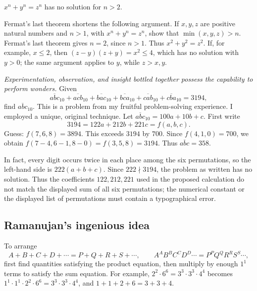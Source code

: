 \documentclass[11pt,a4paper]{article}
\begin{document}
\setcounter{theorem}{50}\begin{lemma}
$x^n+y^n=z^n$ has no solution for $n>2$.
\end{lemma}
Fermat's last theorem shortens the following argument.
If $x,y,z$ are positive natural numbers and $n>1$, with $x^n+y^n=z^n$, show that $\min(x,y,z)>n$.
Fermat's last theorem gives $n=2$, since $n>1$.
Thus $x^2+y^2=z^2$. If, for example, $x\leq2$, then
$(z-y)(z+y)=x^2\leq4$, which has no solution with $y>0$; the same argument applies to $y$, while $z>x,y$.

\emph{Experimentation, observation, and insight bottled together possess
the capability to perform wonders.}
Given
\[
\overline{abc}_{10}+\overline{acb}_{10}+\overline{bac}_{10}
+\overline{bca}_{10}+\overline{cab}_{10}+\overline{cba}_{10}=3194,
\]
find $\overline{abc}_{10}$.
This is a problem from my fruitful problem-solving experience. I employed
a unique, original technique. Let $\overline{abc}_{10}=100a+10b+c$.
First write
\[
3194=122a+212b+221c=f(a,b,c).
\]
Guess: $f(7,6,8)=3894$. This exceeds $3194$ by $700$.
Since $f(4,1,0)=700$, we obtain
$f(7-4,6-1,8-0)=f(3,5,8)=3194$.
Thus $\overline{abc}=358$.

In fact, every digit occurs twice in each
place among the six permutations, so the left-hand side is
$222(a+b+c)$. Since $222\nmid3194$, the problem as written has no
solution. Thus the coefficients $122,212,221$ used in the proposed
calculation do not match the displayed sum of all six permutations; the
numerical constant or the displayed list of permutations must contain a
typographical error.

\subsection{Ramanujan's ingenious idea}
\setcounter{theorem}{53}\begin{lemma}
To arrange
\[
A+B+C+D+\cdots=P+Q+R+S+\cdots,\qquad
A^AB^BC^CD^D\cdots=P^PQ^QR^RS^S\cdots,
\]
first find quantities satisfying the product equation, then multiply by enough $1^1$ terms to satisfy the sum equation.
For example, $2^2\cdot6^6=3^3\cdot3^3\cdot4^4$ becomes
$1^1\cdot1^1\cdot2^2\cdot6^6=3^3\cdot3^3\cdot4^4$,
and $1+1+2+6=3+3+4$.
\end{lemma}
\end{document}
